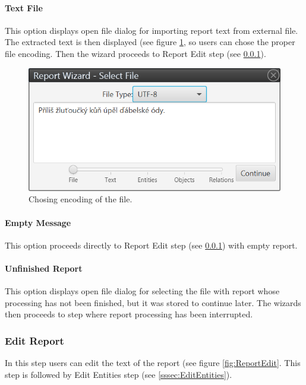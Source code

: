 \paragraph{Text File} This option displays open file dialog for importing
report text from external file. The extracted text is then displayed (see
figure \ref{fig:TextFile}, so users can chose the proper file encoding. Then
the wizard proceeds to Report Edit step (see \ref{sssec:ReportEdit}).

\begin{figure}[!htb]
        \centering
        \includegraphics[width=\textwidth]{Images/textfile}
        \caption{Chosing encoding of the file.}
        \label{fig:TextFile}
\end{figure}

\paragraph{Empty Message} This option proceeds directly to Report Edit step
(see \ref{sssec:ReportEdit}) with empty report.

\paragraph{Unfinished Report} This option displays open file dialog for
selecting the file with report whose processing has not been finished, but it
was stored to continue later. The wizards then proceeds to step where report
processing has been interrupted.

\subsubsection{Edit Report}
\label{sssec:ReportEdit}

In this step users can edit the text of the report (see figure
\ref{fig:ReportEdit}. This step is followed by Edit Entities step (see
\ref{sssec:EditEntities}).

